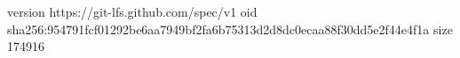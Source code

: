 version https://git-lfs.github.com/spec/v1
oid sha256:954791fcf01292be6aa7949bf2fa6b75313d2d8dc0ecaa88f30dd5e2f44e4f1a
size 174916
